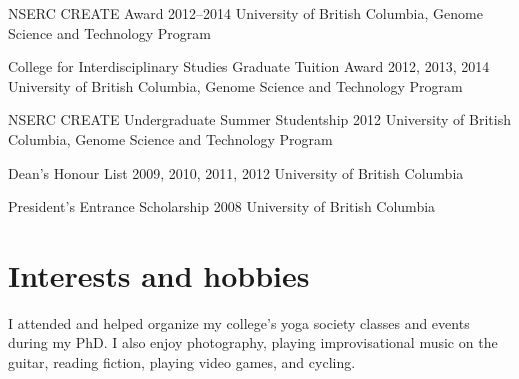\documentclass[10pt]{article}
\begin{document}
\award
    {NSERC CREATE Award}
    {2012--2014}
    {University of British Columbia, Genome Science and Technology Program}


\award
    {College for Interdisciplinary Studies Graduate Tuition Award}
    {2012, 2013, 2014}
    {University of British Columbia, Genome Science and Technology Program}

\award
    {NSERC CREATE Undergraduate Summer Studentship}
    {2012}
    {University of British Columbia, Genome Science and Technology Program}

\award
    {Dean's Honour List}
    {2009, 2010, 2011, 2012}
    {University of British Columbia}



\award
    {President's Entrance Scholarship}
    {2008}
    {University of British Columbia}


\section{Interests and hobbies}
\vspace{-0.2cm}

I attended and helped organize my college's yoga society classes and events during my PhD. I also enjoy photography, playing improvisational music on the guitar, reading fiction, playing video games, and cycling.
\end{document}
